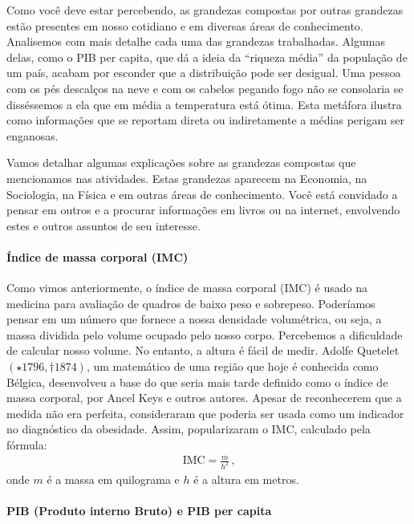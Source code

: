 \label{\detokenize{NO103-2:organizando-ideias-grandezas-compostas}}
Como você deve estar percebendo, as grandezas compostas por outras grandezas estão presentes em nosso cotidiano e em diversas áreas de conhecimento. Analisemos com mais detalhe cada uma das grandezas trabalhadas. Algumas delas, como o PIB per capita, que dá a ideia da “riqueza média” da população de um país, acabam por esconder que a distribuição pode ser desigual. Uma pessoa com os pés descalços na neve e com os cabelos pegando fogo não se consolaria se disséssemos a ela que em média a temperatura está ótima. Esta metáfora ilustra como informações que se reportam direta ou indiretamente a médias perigam ser enganosas.

Vamos detalhar algumas explicações sobre as grandezas compostas que mencionamos nas atividades. Estas grandezas aparecem na Economia, na Sociologia, na Física e em outras áreas de conhecimento. Você está convidado a pensar em outros e a procurar informações em livros ou na internet, envolvendo estes e outros assuntos de seu interesse.

\paragraph{Índice de massa corporal (IMC)}

Como vimos anteriormente, o índice de massa corporal (IMC)  é usado na medicina para avaliação de quadros de baixo peso e sobrepeso.  Poderíamos pensar em um número que fornece a nossa densidade volumétrica, ou seja, a massa dividida pelo volume ocupado pelo nosso corpo. Percebemos a dificuldade de calcular nosso volume. No entanto, a altura é fácil de medir. Adolfe Quetelet $(\star 1796, \dagger 1874)$, um matemático de uma região que hoje é conhecida como Bélgica, desenvolveu a base do que seria mais tarde definido como o índice de massa corporal, por  Ancel Keys e outros autores. Apesar de reconhecerem que a medida não era perfeita, consideraram que poderia ser usada como um indicador no diagnóstico da obesidade. Assim, popularizaram o IMC, calculado pela fórmula:
\begin{equation*}
\begin{split}\text{IMC}=\frac{m}{h^2}\, \text{,}\end{split}
\end{equation*}
onde $m$ é a massa em quilograma e $h$ é a altura em metros.

\paragraph{PIB (Produto interno Bruto) e PIB per capita}

